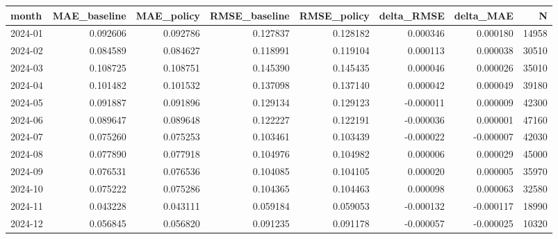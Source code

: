 \begin{tabular}{lrrrrrrr}
\toprule
month & MAE_baseline & MAE_policy & RMSE_baseline & RMSE_policy & delta_RMSE & delta_MAE & N \\
\midrule
2024-01 & 0.092606 & 0.092786 & 0.127837 & 0.128182 & 0.000346 & 0.000180 & 14958 \\
2024-02 & 0.084589 & 0.084627 & 0.118991 & 0.119104 & 0.000113 & 0.000038 & 30510 \\
2024-03 & 0.108725 & 0.108751 & 0.145390 & 0.145435 & 0.000046 & 0.000026 & 35010 \\
2024-04 & 0.101482 & 0.101532 & 0.137098 & 0.137140 & 0.000042 & 0.000049 & 39180 \\
2024-05 & 0.091887 & 0.091896 & 0.129134 & 0.129123 & -0.000011 & 0.000009 & 42300 \\
2024-06 & 0.089647 & 0.089648 & 0.122227 & 0.122191 & -0.000036 & 0.000001 & 47160 \\
2024-07 & 0.075260 & 0.075253 & 0.103461 & 0.103439 & -0.000022 & -0.000007 & 42030 \\
2024-08 & 0.077890 & 0.077918 & 0.104976 & 0.104982 & 0.000006 & 0.000029 & 45000 \\
2024-09 & 0.076531 & 0.076536 & 0.104085 & 0.104105 & 0.000020 & 0.000005 & 35970 \\
2024-10 & 0.075222 & 0.075286 & 0.104365 & 0.104463 & 0.000098 & 0.000063 & 32580 \\
2024-11 & 0.043228 & 0.043111 & 0.059184 & 0.059053 & -0.000132 & -0.000117 & 18990 \\
2024-12 & 0.056845 & 0.056820 & 0.091235 & 0.091178 & -0.000057 & -0.000025 & 10320 \\
\bottomrule
\end{tabular}
